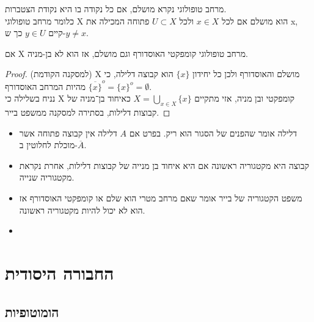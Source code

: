\documentclass{tstextbook}
\begin{document}
\begin{definition}
מרחב טופולוגי נקרא מושלם, אם כל נקודה בו היא נקודת הצטברות.\\

כלומר מרחב טופולוגי X הוא מושלם אם לכל \(x\in X\) ולכל \(U\subset X\) פתוחה המכילה את x, קיים \(y\in U\) כך ש-\(y\ne x\).  

\end{definition}
\begin{corollary}
אם X מרחב טופולוגי קומפקטי האוסדורף וגם מושלם, אז הוא לא בן-מניה.

\end{corollary}
\begin{proof}
(למסקנה הקודמת)
X מושלם והאוסדורף ולכן כל יחידון \(\{x\}\) הוא קבוצה דלילה, כי מהיות המרחב האוסדורף \(\overline{\{x\}}^{o}=\{x\}^{o}=\emptyset\).\\

נניח בשלילה כי X קומפקטי ובן מניה, אזי מתקיים \(X=\bigcup_{x\in X}\{x\}\) כאיחוד בן־מניה של קבוצות דלילות, בסתירה למסקנה ממשפט בייר.  

\end{proof}
\begin{summary}
  \begin{itemize}
    \item דלילה אומר שהפנים של הסגור הוא ריק. בפרט אם \(A\) דלילה אין קבוצה פתוחה אשר מוכלת לחלוטין ב-\(\overline{A}\).
    \item קבוצה היא מקטגוריה ראשונה אם היא איחוד בן מנייה של קבוצות דלילות, אחרת נקראת מקטגוריה שנייה.
    \item משפט הקטגוריה של בייר אומר שאם מרחב מטרי הוא שלם או קומפקטי האוסדורף אז הוא לא יכול להיות מקטגוריה ראשונה.
    \item 
  \end{itemize}
\end{summary}
\chapter{החבורה היסודית}

\section{הומוטופיות}
\end{document}
